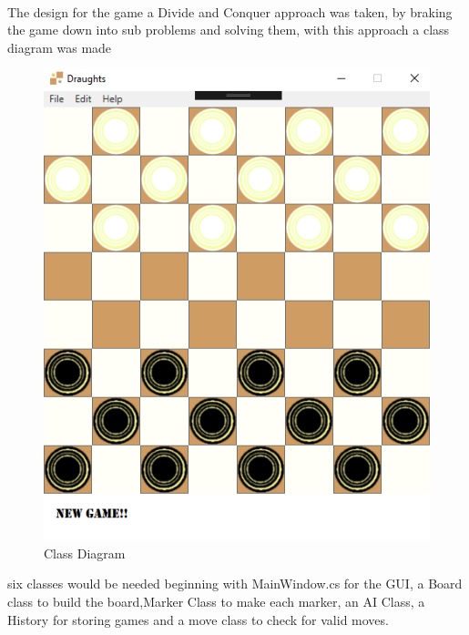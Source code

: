 \documentclass[10pt, a4paper]{article}
\begin{document}
\paragraph{}
	The design for the game  a Divide and Conquer approach was taken,  by braking the game down into sub problems and solving them, with this approach a class diagram was made\begin{figure}[H]
  	
	\centering

  	\includegraphics[scale = 0.4]{board}
  	\caption{Class Diagram}
  	\label{fig:nonfloat}
	\end{figure}
six classes  would be needed beginning with MainWindow.cs for the GUI, a Board class to build the board,Marker Class to make each marker, an AI Class, a History for storing games and a move class to check for valid moves.
\end{document}
